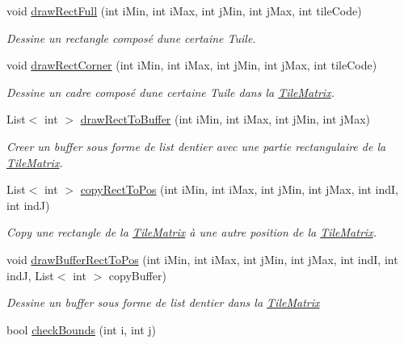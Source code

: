 \begin{DoxyCompactItemize}
void \hyperlink{class_tile_matrix_a35a767fec694f00e38bbd04efbb5c875}{draw\+Rect\+Full} (int i\+Min, int i\+Max, int j\+Min, int j\+Max, int tile\+Code)
\begin{DoxyCompactList}\small\item\em Dessine un rectangle composé d\textquotesingle{}une certaine Tuile. \end{DoxyCompactList}\item 
void \hyperlink{class_tile_matrix_a4ec108d873c8d6aa686ecea4aa8b270b}{draw\+Rect\+Corner} (int i\+Min, int i\+Max, int j\+Min, int j\+Max, int tile\+Code)
\begin{DoxyCompactList}\small\item\em Dessine un cadre composé d\textquotesingle{}une certaine Tuile dans la \hyperlink{class_tile_matrix}{Tile\+Matrix}. \end{DoxyCompactList}\item 
List$<$ int $>$ \hyperlink{class_tile_matrix_a789263572eb4022a693fe71a6c8b5f38}{draw\+Rect\+To\+Buffer} (int i\+Min, int i\+Max, int j\+Min, int j\+Max)
\begin{DoxyCompactList}\small\item\em Creer un buffer sous forme de list d\textquotesingle{}entier avec une partie rectangulaire de la \hyperlink{class_tile_matrix}{Tile\+Matrix}. \end{DoxyCompactList}\item 
List$<$ int $>$ \hyperlink{class_tile_matrix_a02466fdb56bd99691c6402e1bc64e21a}{copy\+Rect\+To\+Pos} (int i\+Min, int i\+Max, int j\+Min, int j\+Max, int indI, int indJ)
\begin{DoxyCompactList}\small\item\em Copy une rectangle de la \hyperlink{class_tile_matrix}{Tile\+Matrix} à une autre position de la \hyperlink{class_tile_matrix}{Tile\+Matrix}. \end{DoxyCompactList}\item 
void \hyperlink{class_tile_matrix_a785c889f1932381852d14e136f81fd28}{draw\+Buffer\+Rect\+To\+Pos} (int i\+Min, int i\+Max, int j\+Min, int j\+Max, int indI, int indJ, List$<$ int $>$ copy\+Buffer)
\begin{DoxyCompactList}\small\item\em Dessine un buffer sous forme de list d\textquotesingle{}entier dans la \hyperlink{class_tile_matrix}{Tile\+Matrix} \end{DoxyCompactList}\item 
bool \hyperlink{class_tile_matrix_a0f2e1f3c6eda5d5c60a48ccf3ab26c3b}{check\+Bounds} (int i, int j)

\end{DoxyCompactItemize}
